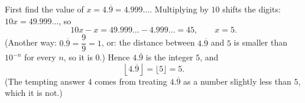 First find the value of $x=4.\overline{9}=4.999\ldots$. Multiplying by $10$ shifts the digits: $10x=49.999\ldots$, so
\[
10x-x=49.999\ldots-4.999\ldots=45,\qquad x=5 .
\]
(Another way: $0.\overline{9}=\dfrac{9}{9}=1$, or: the distance between $4.\overline{9}$ and $5$ is smaller than $10^{-n}$ for every $n$, so it is $0$.) Hence $4.\overline{9}$ is the integer $5$, and
\[
\left\lfloor4.\overline{9}\right\rfloor=\lfloor5\rfloor=\boxed{5}.
\]
(The tempting answer $4$ comes from treating $4.\overline{9}$ as a number slightly less than $5$, which it is not.)

